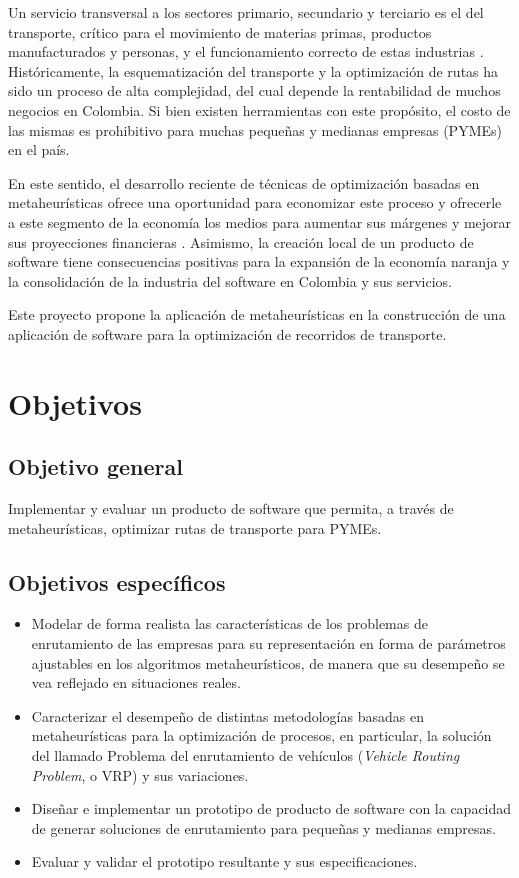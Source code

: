 \documentclass[12pt]{extarticle}
\begin{document}
Un servicio transversal a los sectores primario, secundario y terciario es el
del transporte, crítico para el movimiento de materias primas, productos
manufacturados y personas, y el funcionamiento correcto de estas industrias
\cite{r_situacion_2010}. Históricamente, la esquematización del transporte y
la optimización de rutas ha sido un proceso de alta complejidad, del cual
depende la rentabilidad de muchos negocios en Colombia. Si bien existen
herramientas con este propósito, el costo de las mismas es prohibitivo para
muchas pequeñas y medianas empresas (PYMEs) en el país.

En este sentido, el desarrollo reciente de técnicas de optimización basadas en
metaheurísticas ofrece una oportunidad para economizar este proceso y ofrecerle
a este segmento de la economía los medios para aumentar sus márgenes y mejorar
sus proyecciones financieras \cite{gomez_metaheuristicas_2014}. Asimismo, la
creación local de un producto de software tiene consecuencias positivas para la
expansión de la economía naranja y la consolidación de la industria del software
en Colombia y sus servicios.

Este proyecto propone la aplicación de metaheurísticas en la construcción de una
aplicación de software para la optimización de recorridos de transporte.

\section{Objetivos}

\subsection{Objetivo general}
Implementar y evaluar un producto de software que permita, a través de
metaheurísticas, optimizar rutas de transporte para PYMEs.

\subsection{Objetivos específicos}
\begin{itemize}
\item Modelar de forma realista las características de los problemas de
  enrutamiento de las empresas para su representación en forma de parámetros
  ajustables en los algoritmos metaheurísticos, de manera que su desempeño
  se vea reflejado en situaciones reales.
\item Caracterizar el desempeño de distintas metodologías basadas en
  metaheurísticas para la optimización de procesos, en particular, la solución
  del llamado Problema del enrutamiento de vehículos (\textit{Vehicle Routing
  Problem}, o VRP) y sus variaciones.
\item Diseñar e implementar un prototipo de producto de software con la
  capacidad de generar soluciones de enrutamiento para pequeñas y medianas
  empresas.
\item Evaluar y validar el prototipo resultante y sus especificaciones.
\end{itemize}

\printbibliography[title={Bibliografía}]
\end{document}
